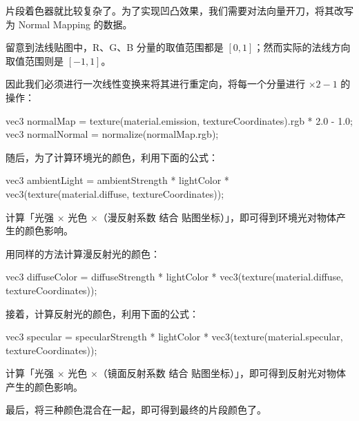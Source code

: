 \documentclass[
]{article}
\newenvironment{Shaded}{}{}
\newcommand{\FloatTok}[1]{\textcolor[rgb]{0.25,0.63,0.44}{#1}}
\newcommand{\NormalTok}[1]{#1}
\begin{document}
片段着色器就比较复杂了。为了实现凹凸效果，我们需要对法向量开刀，将其改写为
Normal Mapping 的数据。

留意到法线贴图中，R、G、B 分量的取值范围都是
\([0, 1]\)；然而实际的法线方向取值范围则是 \([-1, 1]\)。

因此我们必须进行一次线性变换来将其进行重定向，将每一个分量进行
\(\times 2 - 1\) 的操作：

\begin{Shaded}
\begin{Highlighting}[]
\NormalTok{vec3 normalMap = texture(material.emission, textureCoordinates).rgb * }\FloatTok{2.0}\NormalTok{ - }\FloatTok{1.0}\NormalTok{;}
\NormalTok{vec3 normalNormal = normalize(normalMap.rgb);}
\end{Highlighting}
\end{Shaded}

随后，为了计算环境光的颜色，利用下面的公式：

\begin{Shaded}
\begin{Highlighting}[]
\NormalTok{vec3 ambientLight = ambientStrength * lightColor * vec3(texture(material.diffuse, textureCoordinates));}
\end{Highlighting}
\end{Shaded}

计算「光强 × 光色 ×（漫反射系数 结合
贴图坐标）」，即可得到环境光对物体产生的颜色影响。

用同样的方法计算漫反射光的颜色：

\begin{Shaded}
\begin{Highlighting}[]
\NormalTok{vec3 diffuseColor = diffuseStrength * lightColor * vec3(texture(material.diffuse, textureCoordinates));}
\end{Highlighting}
\end{Shaded}

接着，计算反射光的颜色，利用下面的公式：

\begin{Shaded}
\begin{Highlighting}[]
\NormalTok{vec3 specular = specularStrength * lightColor * vec3(texture(material.specular, textureCoordinates));}
\end{Highlighting}
\end{Shaded}

计算「光强 × 光色 ×（镜面反射系数 结合
贴图坐标）」，即可得到反射光对物体产生的颜色影响。

最后，将三种颜色混合在一起，即可得到最终的片段颜色了。
\end{document}
